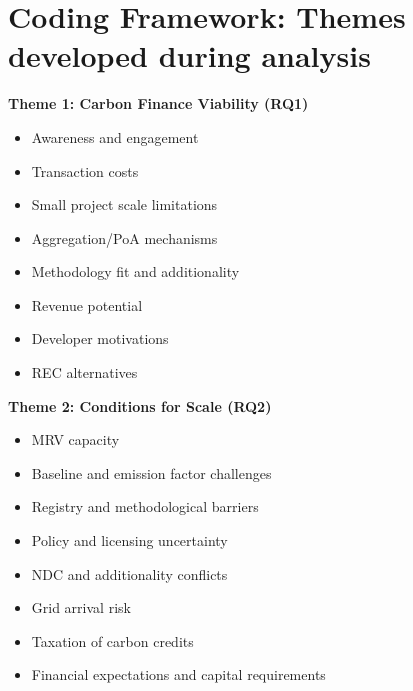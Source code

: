 \section{Coding Framework: Themes developed during analysis}
\label{app:framework}
\textbf{Theme 1: Carbon Finance Viability (RQ1)}
\begin{itemize}
	\item Awareness and engagement
	\item Transaction costs
	\item Small project scale limitations
	\item Aggregation/PoA mechanisms
	\item Methodology fit and additionality
	\item Revenue potential
	\item Developer motivations
	\item REC alternatives
\end{itemize}

\textbf{Theme 2: Conditions for Scale (RQ2)}
\begin{itemize}
	\item MRV capacity
	\item Baseline and emission factor challenges
	\item Registry and methodological barriers
	\item Policy and licensing uncertainty
	\item NDC and additionality conflicts
	\item Grid arrival risk
	\item Taxation of carbon credits
	\item Financial expectations and capital requirements
\end{itemize}
